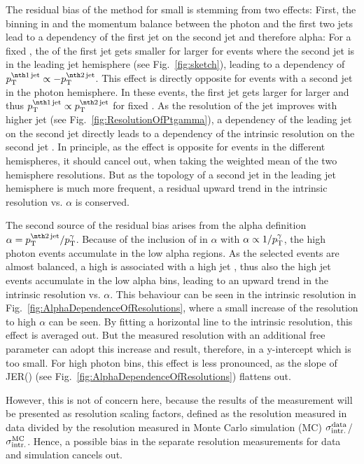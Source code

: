 The residual bias of the method for small \ptgamma is stemming from two effects: 
First, the binning in \ptgamma and the momentum balance between the photon and the first two jets lead to a dependency of the first jet \pt on the second jet \pt and therefore alpha: 
For a fixed \ptgamma, the \pt of the first jet gets smaller for larger \ptsecondjet for events where the second jet is in the leading jet hemisphere (see Fig.~\ref{fig:sketch}), 
leading to a dependency of $\ptfirstjet \propto -\ptsecondjet$.
This effect is directly opposite for events with a second jet in the photon hemisphere. 
In these events, the first jet \pt gets larger for larger \ptsecondjet and thus $\ptfirstjet \propto \ptsecondjet$ for fixed \ptgamma. 
As the resolution of the jet improves with higher jet \pt (see Fig.~\ref{fig:ResolutionOfPtgamma}), a dependency of the leading jet \pt on the second jet \pt directly leads to a dependency of the intrinsic resolution on the second jet \pt. 
In principle, as the effect is opposite for events in the different hemispheres, it should cancel out, when taking the weighted mean of the two hemisphere resolutions. 
But as the topology of a second jet in the leading jet hemisphere is much more frequent, a residual upward trend in the intrinsic resolution vs. $\alpha$ is conserved. 

The second source of the residual bias arises from the alpha definition $\alpha = \ptsecondjet/\ptgamma$. 
Because of the inclusion of \ptgamma in $\alpha$ with $\alpha \propto 1/{p}_\mathrm{T}^{\gamma}$, 
the high photon \pt events accumulate in the low alpha regions. 
As the selected events are almost balanced, a high \ptgamma is associated with a high jet \pt, thus also the high jet \pt events accumulate in the low alpha bins, leading to  an upward trend in the intrinsic resolution vs. $\alpha$. 
This behaviour can be seen in the intrinsic resolution in Fig.~\ref{fig:AlphaDependenceOfResolutions}, where a small increase of the resolution to high $\alpha$ can be seen. 
By fitting a horizontal line to the intrinsic resolution, this effect is averaged out. 
But the measured resolution with an additional free parameter can adopt this increase and result, therefore, in a y-intercept which is too small. 
For high photon \pt bins, this effect is less pronounced, as the slope of JER(\ptgamma) (see Fig.~\ref{fig:AlphaDependenceOfResolutions}) flattens out.

However, this is not of concern here, because the results of the measurement will be presented as resolution scaling factors, defined as the resolution measured in data divided by the resolution measured in Monte Carlo simulation (MC) 
$\sigma_\mathrm{intr.}^{\text{data}}$/$\sigma_\mathrm{intr.}^{\text{MC}}$. 
Hence, a possible bias in the separate resolution measurements for data and simulation cancels out. 

